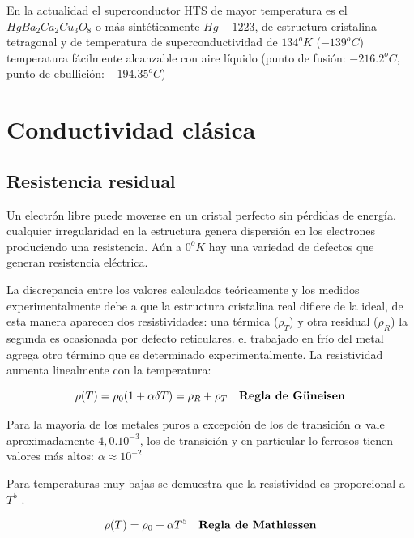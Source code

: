 \begin{sloppypar}
En la actualidad el superconductor HTS de mayor temperatura es el ${HgBa_{2}Ca_{2}Cu_{3}O_{8}}$ o más sintéticamente $Hg-1223$, de estructura cristalina tetragonal y de temperatura de superconductividad de $134^{o}K$ ($-139^{o}C$) temperatura fácilmente alcanzable con aire líquido (punto de fusión: $-216.2^{o}C$, punto de ebullición: $-194.35^{o}C$)
\end{sloppypar}

\section{Conductividad clásica}
\label{sec:pruebasHW}

\subsection{Resistencia residual} 

Un electrón libre puede moverse en un cristal perfecto sin pérdidas de energía. cualquier irregularidad en la estructura genera dispersión en los electrones produciendo una resistencia. Aún a $0^{o}K$ hay una variedad de defectos que generan resistencia eléctrica.

La discrepancia entre los valores calculados teóricamente y los medidos experimentalmente debe a que la estructura cristalina real difiere de la ideal, de esta manera aparecen dos resistividades: una térmica ($\rho_{T}$) y otra residual ($\rho_{R}$) la segunda es ocasionada por defecto reticulares. el trabajado en frío del metal agrega otro término que es determinado experimentalmente. La resistividad aumenta linealmente con la temperatura:


\begin{equation}
\rho(T)= \rho_{0}(1+\alpha \delta T) = \rho_{R} + \rho_{T} \quad \text{\textbf{Regla de G\"uneisen}}  
\end{equation}

Para la mayoría de los metales puros a excepción de los de transición $\alpha$ vale aproximadamente $4,0.10^{-3}$, los de transición y en particular lo ferrosos tienen valores más altos: $\alpha \approx 10^{-2}$

Para temperaturas muy bajas se demuestra que la resistividad es proporcional a $T^{5}$ .

\begin{equation}
	\rho(T)= \rho_{0}+\alpha T^{5} \quad \text{\textbf{Regla de Mathiessen}}  
\end{equation}

